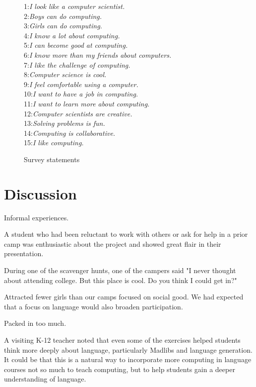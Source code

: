 \begin{figure}
{\small
1:\textit{I look like a computer scientist.} \\
2:\textit{Boys can do computing.} \\
3:\textit{Girls can do computing.} \\
4:\textit{I know a lot about computing.} \\
5:\textit{I can become good at computing.} \\
6:\textit{I know more than my friends about computers.} \\
7:\textit{I like the challenge of computing.} \\
8:\textit{Computer science is cool.} \\
9:\textit{I feel comfortable using a computer.} \\
10:\textit{I want to have a job in computing.} \\
11:\textit{I want to learn more about computing.} \\
12:\textit{Computer scientists are creative.} \\
13:\textit{Solving problems is fun.} \\
14:\textit{Computing is collaborative.} \\
15:\textit{I like computing.} 
}
\caption{Survey statements}
\end{figure}

\section{Discussion}

Informal experiences.

A student who had been reluctant to work with others or ask for help
in a prior camp was enthusiastic about the project and showed great
flair in their presentation.

During one of the scavenger hunts, one of the campers said "I never
thought about attending college.  But this place is cool.  Do you
think I could get in?"

Attracted fewer girls than our camps focused on social good.  We had
expected that a focus on language would also broaden participation.  

Packed in too much.

A visiting K-12 teacher noted that even some of the exercises helped
students think more deeply about language, particularly Madlibs and language
generation.  It could be that this is a natural way to incorporate more
computing in language courses not so much to teach computing, but to 
help students gain a deeper understanding of language.

